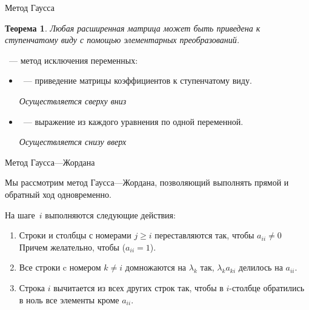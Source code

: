 \documentclass[unicode,11pt,notheorems]{beamer}
\newtheorem{theorem}{Теорема}
\begin{document}
\begin{frame}{Метод Гаусса}
	\begin{theorem}
		Любая расширенная матрица может быть приведена к ступенчатому виду с помощью элементарных преобразований.
	\end{theorem}
	
	\bigskip
	~--- метод исключения переменных:
	\begin{itemize}
	\item 
		~--- приведение матрицы коэффициентов к ступенчатому виду.
		
		{\raggedleft \itshape Осуществляется сверху вниз\par}
	\bigskip
	\item 
		~--- выражение из каждого уравнения по одной переменной. 

		{\raggedleft \itshape Осуществляется снизу вверх\par}
		
	
	\end{itemize}	
\end{frame}


\begin{frame}{Метод Гаусса---Жордана}

Мы рассмотрим метод \alert{Гаусса---Жордана}, позволяющий выполнять прямой и обратный ход одновременно.

	На шаге~$i$ выполняются следующие действия:
	\begin{enumerate}
	\item 
		Строки и столбцы с номерами $j \geqslant i$ переставляются так, чтобы  $a_{ii} \neq 0$ Причем желательно, чтобы ($a_{ii}=1$).
	\item
		Все строки c номером $k\neq i$ домножаются на $\lambda_k$ так, $\lambda_ka_{ki}$ делилось на $a_{ii}$.
	\item 
		Строка $i$ вычитается из всех других строк так, чтобы в $i$-столбце обратились в ноль все элементы кроме $a_{ii}$.
	\end{enumerate}
\end{frame}
\end{document}
